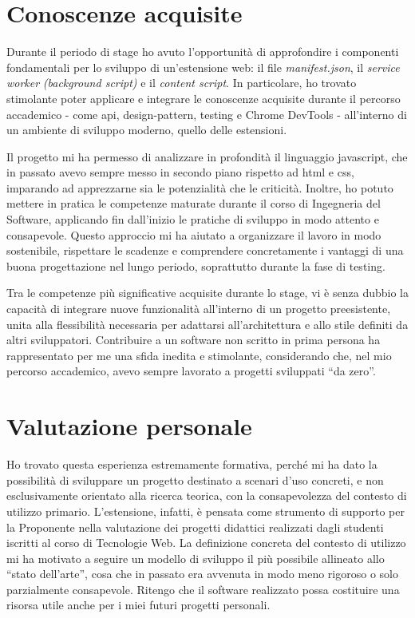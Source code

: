 \section{Conoscenze acquisite}

Durante il periodo di stage ho avuto l’opportunità di approfondire i componenti fondamentali per lo sviluppo di un’estensione web: il file \textit{manifest.json}, il \textit{service worker} \textit{(background script)} e il \textit{content script}. In particolare, ho trovato stimolante poter applicare e integrare le conoscenze acquisite durante il percorso accademico - come \gls{api}, \gls{design-pattern}, testing e Chrome DevTools - all’interno di un ambiente di sviluppo moderno, quello delle estensioni.

\vspace{10pt}
\noindent Il progetto mi ha permesso di analizzare in profondità il linguaggio \gls{javascript}, che in passato avevo sempre messo in secondo piano rispetto ad \gls{html} e \gls{css}, imparando ad apprezzarne sia le potenzialità che le criticità. Inoltre, ho potuto mettere in pratica le competenze maturate durante il corso di Ingegneria del Software, applicando fin dall’inizio le pratiche di sviluppo in modo attento e consapevole. Questo approccio mi ha aiutato a organizzare il lavoro in modo sostenibile, rispettare le scadenze e comprendere concretamente i vantaggi di una buona progettazione nel lungo periodo, soprattutto durante la fase di testing.

\vspace{10pt}
\noindent Tra le competenze più significative acquisite durante lo stage, vi è senza dubbio la capacità di integrare nuove funzionalità all’interno di un progetto preesistente, unita alla flessibilità necessaria per adattarsi all’architettura e allo stile definiti da altri sviluppatori. Contribuire a un software non scritto in prima persona ha rappresentato per me una sfida inedita e stimolante, considerando che, nel mio percorso accademico, avevo sempre lavorato a progetti sviluppati “da zero”.

\section{Valutazione personale}

Ho trovato questa esperienza estremamente formativa, perché mi ha dato la possibilità di sviluppare un progetto destinato a scenari d’uso concreti, e non esclusivamente orientato alla ricerca teorica, con la consapevolezza del contesto di utilizzo primario. L’estensione, infatti, è pensata come strumento di supporto per la Proponente nella valutazione dei progetti didattici realizzati dagli studenti iscritti al corso di Tecnologie Web. La definizione concreta del contesto di utilizzo mi ha motivato a seguire un modello di sviluppo il più possibile allineato allo “stato dell’arte”, cosa che in passato era avvenuta in modo meno rigoroso o solo parzialmente consapevole. Ritengo che il software realizzato possa costituire una risorsa utile anche per i miei futuri progetti personali.

